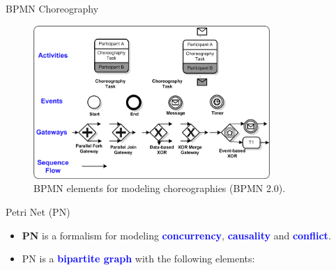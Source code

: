 \documentclass[xcolor=svgnames]{beamer}
\begin{document}
  \begin{frame}{BPMN Choreography}

    \begin{figure}[!h]
	      \centering
	      \includegraphics[width=0.8\textwidth]{BPMNBasicChoroegraphy.png}
	      \caption{BPMN elements for modeling choreographies (BPMN 2.0).}
      \end{figure}	
  \end{frame}

  \begin{frame}{ Petri Net (PN)}
      \begin{itemize}
	    \item < 1-> \textbf{PN} is a formalism for modeling \textcolor{blue}{\textbf{concurrency}},  \textcolor{blue}{\textbf{causality}} and \textcolor{blue}{\textbf{conflict}}.	
	    \item < 2-> PN is a \textcolor{blue}{\textbf{bipartite graph}} with the following elements:
      \end{itemize}

  \end{frame}
\end{document}
